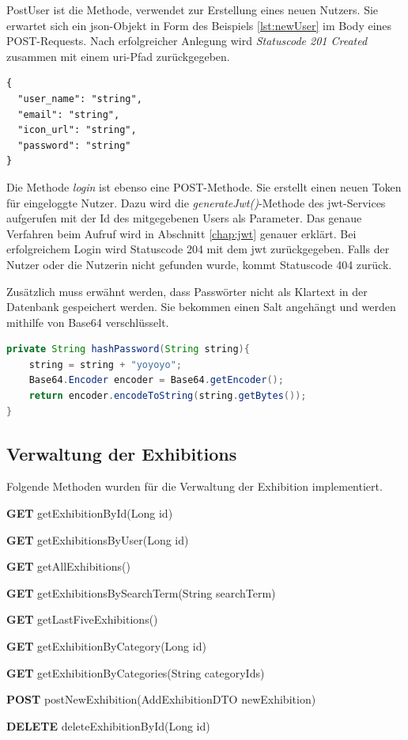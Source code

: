 PostUser ist die Methode, verwendet zur Erstellung eines neuen Nutzers. 
Sie erwartet sich ein \gls{json}-Objekt in Form des Beispiels \ref{lst:newUser} im Body eines POST-Requests. 
Nach erfolgreicher Anlegung wird \emph{Statuscode 201 Created} zusammen mit einem \gls{uri}-Pfad zurückgegeben. 

\begin{lstlisting}[label=lst:newUser, caption=PostUser]
{
  "user_name": "string",
  "email": "string",
  "icon_url": "string",
  "password": "string"
}
\end{lstlisting}

Die Methode \emph{login} ist ebenso eine POST-Methode. 
Sie erstellt einen neuen Token für eingeloggte Nutzer. 
Dazu wird die \emph{generateJwt()}-Methode des \gls{jwt}-Services aufgerufen mit der Id des mitgegebenen Users als Parameter. 
Das genaue Verfahren beim Aufruf wird in Abschnitt \ref{chap:jwt} genauer erklärt. 
Bei erfolgreichem Login wird Statuscode 204 mit dem \gls{jwt} zurückgegeben. 
Falls der Nutzer oder die Nutzerin nicht gefunden wurde, kommt Statuscode 404 zurück.

Zusätzlich muss erwähnt werden, dass Passwörter nicht als Klartext in der Datenbank gespeichert werden. 
Sie bekommen einen Salt angehängt und werden mithilfe von Base64 verschlüsselt.
\begin{lstlisting}[label=lst:passwordhashing,language=Java, caption=Hashing des Passwortes]
private String hashPassword(String string){
    string = string + "yoyoyo";
    Base64.Encoder encoder = Base64.getEncoder();
    return encoder.encodeToString(string.getBytes());
}
\end{lstlisting}

\subsection{Verwaltung der Exhibitions}
Folgende Methoden wurden für die Verwaltung der Exhibition implementiert. 
\begin{compactitem}
    \item \textbf{GET} getExhibitionById(Long id)
    \item \textbf{GET} getExhibitionsByUser(Long id) 
    \item \textbf{GET} getAllExhibitions()
    \item \textbf{GET} getExhibitionsBySearchTerm(String searchTerm)
    \item \textbf{GET} getLastFiveExhibitions() 
    \item \textbf{GET} getExhibitionByCategory(Long id) 
    \item \textbf{GET} getExhibitionByCategories(String categoryIds)
    \item \textbf{POST} postNewExhibition(AddExhibitionDTO newExhibition)
    \item \textbf{DELETE} deleteExhibitionById(Long id)
\end{compactitem}

